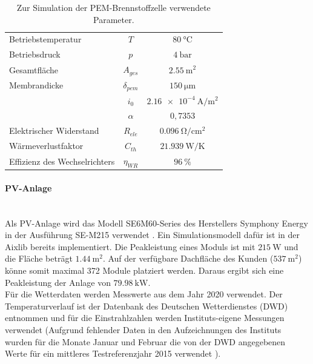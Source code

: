 \begin{table}[ht]
		\centering
		\caption{Zur Simulation der PEM-Brennstoffzelle verwendete Parameter.}
		\begin{tabular}{l c c}
		\toprule
		Betriebstemperatur & $T$ & $\SI{80}{\degreeCelsius}$\\
		Betriebsdruck & $p$ & $\SI{4}{\bar}$\\
		Gesamtfläche & $A_{ges}$ & $\SI{2,55}{\m\squared }$\\
		Membrandicke & $\delta_{pem}$ & $\SI{150}{\micro\m}$\\
		 & $i_0$ & $ \SI{2,16e-4}{\A\per\m\squared}$\\
		 & $\alpha$ & $0,7353$\\
		Elektrischer Widerstand & $R_{ele}$ & $\SI{0,096}{\ohm\per\cm\squared}$ \citep{tjarks_pem-elektrolyse-systeme_2017}\\	
		Wärmeverlustfaktor & $C_{th}$ & $\SI{21,939}{\W\per\K}$\\
		Effizienz des Wechselrichters & $\eta_{WR}$ & $\SI{96}{\%}$ \\
		\bottomrule
		\end{tabular}
		\label{tb:ParameterBrennstoffzelle}
\end{table}	

\paragraph{PV-Anlage}\ \\
Als PV-Anlage wird das Modell SE6M60-Series des Herstellers Symphony Energy in der Ausführung SE-M215 verwendet \citep{symphony_energy_coltd_se6m60_nodate}. Ein Simulationsmodell dafür ist in der Aixlib bereits implementiert. Die Peakleistung eines Moduls ist mit $\SI{215}{\W}$ und die Fläche beträgt $\SI{1,44}{\m\squared}$. Auf der verfügbare Dachfläche des Kunden ($\SI{537}{\m\squared}$) könne somit maximal 372 Module platziert werden. Daraus ergibt sich eine Peakleistung der Anlage von $\SI{79,98}{\kilo\W}$.\\
Für die Wetterdaten werden Messwerte aus dem Jahr 2020 verwendet. Der Temperaturverlauf ist der Datenbank des Deutschen Wetterdienstes (DWD) entnommen \citep{dwd_historische_nodate} und für die Einstrahlzahlen werden Instituts-eigene Messungen verwendet (Aufgrund fehlender Daten in den Aufzeichnungen des Instituts wurden für die Monate Januar und Februar die von der DWD angegebenen Werte für ein mittleres Testreferenzjahr 2015 verwendet \citep{dwd_klimaberatungsmodul_nodate}).

